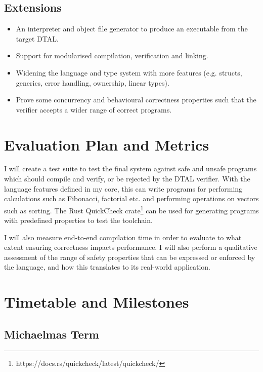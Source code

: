 \documentclass[a4paper, 12pt]{article}
\begin{document}
\subsection{Extensions}

\begin{itemize}
  \item An interpreter and object file generator to produce an executable from the target DTAL.
  \item Support for modularised compilation, verification and linking.
  \item Widening the language and type system with more features (e.g. structs, generics, error handling, ownership, linear types).
  \item Prove some concurrency and behavioural correctness properties such that the verifier accepts a wider range of correct programs.
\end{itemize}

\section{Evaluation Plan and Metrics}

I will create a test suite to test the final system against safe and unsafe programs which should compile and verify, or be rejected by the DTAL verifier. With the language features defined in my core, this can write programs for performing calculations such as Fibonacci, factorial etc. and performing operations on vectors such as sorting. The Rust QuickCheck crate\footnote{https://docs.rs/quickcheck/latest/quickcheck/} can be used for generating programs with predefined properties to test the toolchain.

I will also measure end-to-end compilation time in order to evaluate to what extent ensuring correctness impacts performance. I will also perform a qualitative assessment of the range of safety properties that can be expressed or enforced by the language, and how this translates to its real-world application.


\section{Timetable and Milestones}

\subsection{Michaelmas Term}
\end{document}
